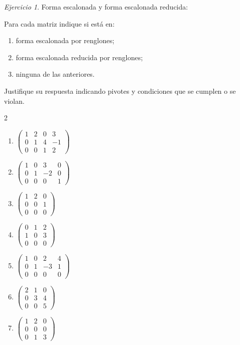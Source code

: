 \documentclass[12pt]{article}
\theoremstyle{remark}
\newtheorem{Ejer}[definicion]{Ejercicio}
\begin{document}
\begin{Ejer} Forma escalonada y forma escalonada reducida:

Para cada matriz indique si está en:
\begin{enumerate}[label=\alph*)]
\item forma escalonada por renglones;
\item forma escalonada reducida por renglones;
\item ninguna de las anteriores.
\end{enumerate}
Justifique su respuesta indicando pivotes y condiciones que se cumplen o se violan.

\begin{multicols}{2}
\begin{enumerate}[resume]
\item $\begin{pmatrix}1&2&0&3\\0&1&4&-1\\0&0&1&2\end{pmatrix}$
\item $\begin{pmatrix}1&0&3&0\\0&1&-2&0\\0&0&0&1\end{pmatrix}$
\item $\begin{pmatrix}1&2&0\\0&0&1\\0&0&0\end{pmatrix}$
\item $\begin{pmatrix}0&1&2\\1&0&3\\0&0&0\end{pmatrix}$
\item $\begin{pmatrix}1&0&2&4\\0&1&-3&1\\0&0&0&0\end{pmatrix}$
\item $\begin{pmatrix}2&1&0\\0&3&4\\0&0&5\end{pmatrix}$
\item $\begin{pmatrix}1&2&0\\0&0&0\\0&1&3\end{pmatrix}$

\end{enumerate}
\end{multicols}
\end{Ejer}
\end{document}
